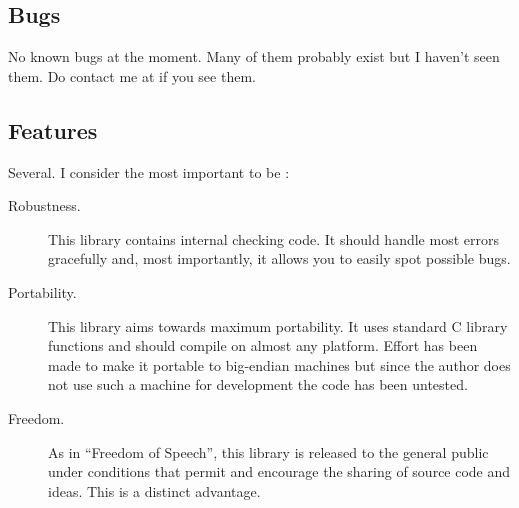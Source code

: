 \documentclass[12pt, a4paper]{article}
\begin{document}
\subsection{Bugs}
No known bugs at the moment. Many of them probably exist but I haven't
seen them. Do contact me at \mymail{} if you see them.
\subsection{Features}
Several. I consider the most important to be :
\begin{description}
\item[Robustness.] This library contains internal checking code. It should
handle most errors gracefully and, most importantly, it allows you to easily
spot possible bugs.
\item[Portability.] This library aims towards maximum portability. It uses
standard C library functions and should compile on almost any platform.
Effort has been made to make it portable to big-endian machines but since
the author does not use such a machine for development the code has
been untested. 
\item[Freedom.] As in ``Freedom of Speech'', this library is released to the
general public under conditions that permit and encourage the sharing of
source code and ideas. This is a distinct advantage.
\end{description}
\end{document}
